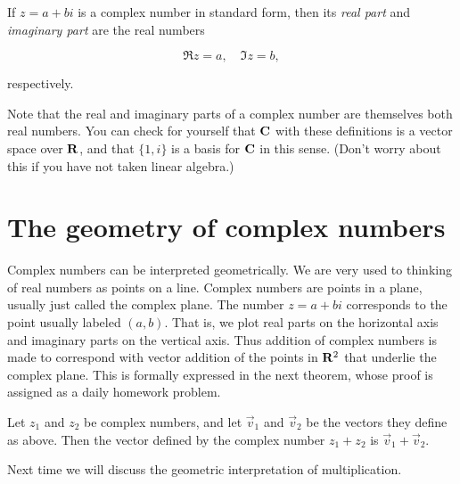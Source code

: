 \documentclass[twocolumn,12pt]{article}
\begin{document}
\begin{definition}
  If $z = a + bi$ is a complex number in standard form, then its \emph{real part} and \emph{imaginary part} are the real numbers
  \begin{gridenv}
  \begin{equation*}
      \Re{z} = a, \quad \Im{z} = b,
    \end{equation*}
  \end{gridenv}
  respectively.
\end{definition}
Note that the real and imaginary parts of a complex number are themselves both real numbers. You can check for yourself that $\mathbf{C}$ with these definitions is a vector space over $\mathbf{R}$, and that $\{ 1, i \}$ is a basis for $\mathbf{C}$ in this sense. (Don't worry about this if you have not taken linear algebra.)

\section{The geometry of complex numbers}

Complex numbers can be interpreted geometrically. We are very used to thinking of real numbers as points on a line. Complex numbers are points in a plane, usually just called the complex plane. The number $z = a+ bi$ corresponds to the point usually labeled $(a,b)$. That is, we plot real parts on the horizontal axis and imaginary parts on the vertical axis. Thus addition of complex numbers is made to correspond with vector addition of the points in $\mathbf{R}^2$ that underlie the complex plane. This is formally expressed in the next theorem, whose proof is assigned as a daily homework problem.
%
\begin{Theorem}
  Let $z_1$ and $z_2$ be complex numbers, and let $\vec{v}_1$ and $\vec{v}_2$ be the vectors they define as above. Then the vector defined by the complex number $z_1 + z_2$ is $\vec{v}_1 + \vec{v}_2$.
\end{Theorem}
Next time we will discuss the geometric interpretation of multiplication.
\end{document}
